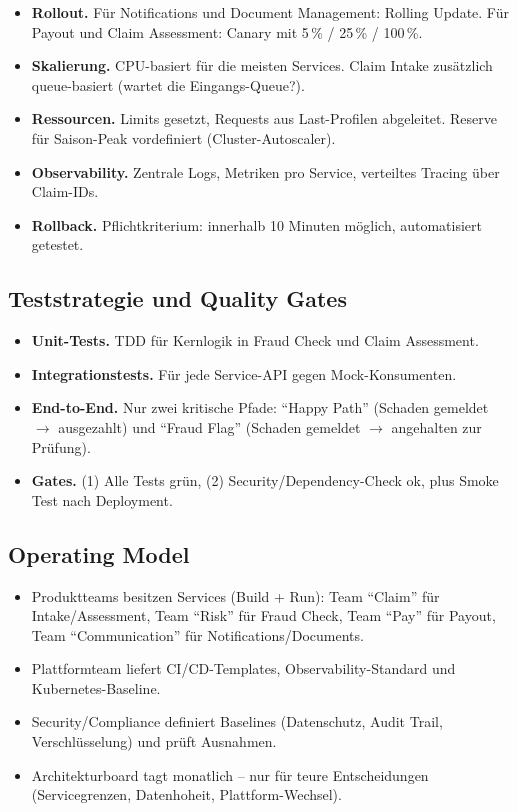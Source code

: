 \documentclass[11pt,a4paper,oneside]{article}
\begin{document}
\begin{itemize}
  \item \textbf{Rollout.} Für Notifications und Document Management: Rolling Update. Für Payout und Claim Assessment: Canary mit 5\,\% / 25\,\% / 100\,\%.
  \item \textbf{Skalierung.} CPU-basiert für die meisten Services. Claim Intake zusätzlich queue-basiert (wartet die Eingangs-Queue?).
  \item \textbf{Ressourcen.} Limits gesetzt, Requests aus Last-Profilen abgeleitet. Reserve für Saison-Peak vordefiniert (Cluster-Autoscaler).
  \item \textbf{Observability.} Zentrale Logs, Metriken pro Service, verteiltes Tracing über Claim-IDs.
  \item \textbf{Rollback.} Pflichtkriterium: innerhalb 10 Minuten möglich, automatisiert getestet.
\end{itemize}

\subsection{Teststrategie und Quality Gates}

\begin{itemize}
  \item \textbf{Unit-Tests.} TDD für Kernlogik in Fraud Check und Claim Assessment.
  \item \textbf{Integrationstests.} Für jede Service-API gegen Mock-Konsumenten.
  \item \textbf{End-to-End.} Nur zwei kritische Pfade: ``Happy Path'' (Schaden gemeldet $\to$ ausgezahlt) und ``Fraud Flag'' (Schaden gemeldet $\to$ angehalten zur Prüfung).
  \item \textbf{Gates.} (1) Alle Tests grün, (2) Security/Dependency-Check ok, plus Smoke Test nach Deployment.
\end{itemize}

\subsection{Operating Model}

\begin{itemize}
  \item Produktteams besitzen Services (Build + Run): Team ``Claim'' für Intake/Assessment, Team ``Risk'' für Fraud Check, Team ``Pay'' für Payout, Team ``Communication'' für Notifications/Documents.
  \item Plattformteam liefert CI/CD-Templates, Observability-Standard und Kubernetes-Baseline.
  \item Security/Compliance definiert Baselines (Datenschutz, Audit Trail, Verschlüsselung) und prüft Ausnahmen.
  \item Architekturboard tagt monatlich -- nur für teure Entscheidungen (Servicegrenzen, Datenhoheit, Plattform-Wechsel).
\end{itemize}
\end{document}
